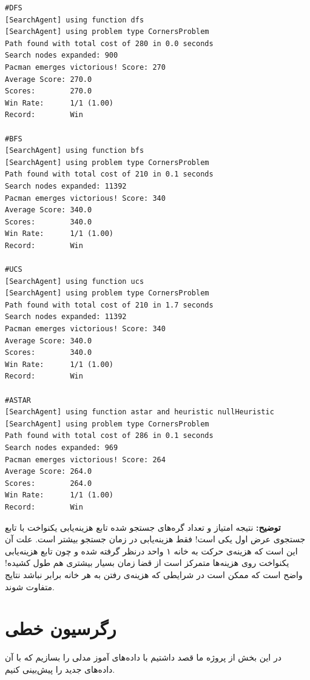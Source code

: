 \documentclass[11pt, a4paper, oneside]{book}
\begin{document}
\begin{LTR}
	\begin{verbatim}
#DFS
[SearchAgent] using function dfs
[SearchAgent] using problem type CornersProblem
Path found with total cost of 280 in 0.0 seconds
Search nodes expanded: 900
Pacman emerges victorious! Score: 270
Average Score: 270.0
Scores:        270.0
Win Rate:      1/1 (1.00)
Record:        Win

#BFS
[SearchAgent] using function bfs
[SearchAgent] using problem type CornersProblem
Path found with total cost of 210 in 0.1 seconds
Search nodes expanded: 11392
Pacman emerges victorious! Score: 340
Average Score: 340.0
Scores:        340.0
Win Rate:      1/1 (1.00)
Record:        Win

#UCS
[SearchAgent] using function ucs
[SearchAgent] using problem type CornersProblem
Path found with total cost of 210 in 1.7 seconds
Search nodes expanded: 11392
Pacman emerges victorious! Score: 340
Average Score: 340.0
Scores:        340.0
Win Rate:      1/1 (1.00)
Record:        Win

#ASTAR
[SearchAgent] using function astar and heuristic nullHeuristic
[SearchAgent] using problem type CornersProblem
Path found with total cost of 286 in 0.1 seconds
Search nodes expanded: 969
Pacman emerges victorious! Score: 264
Average Score: 264.0
Scores:        264.0
Win Rate:      1/1 (1.00)
Record:        Win
	\end{verbatim}
\end{LTR}

\textbf{توضیح:}
 نتیجه امتیاز و تعداد گره‌های جستجو شده  تابع هزینه‌یابی یکنواخت با تابع جستجوی عرض اول یکی است! فقط هزینه‌یابی در زمان جستجو بیشتر است. علت آن این است که هزینه‌ی حرکت به خانه ۱ واحد درنظر گرفته شده و چون تابع هزینه‌یابی یکنواخت روی هزینه‌ها متمرکز است از قضا زمان بسیار بیشتری هم طول کشیده! واضح است که ممکن است در شرایطی که هزینه‌ی رفتن به هر خانه برابر نباشد نتایج متفاوت شوند.

	
	
	
	
	
	
	
	
	
	
	
	\chapter{رگرسیون خطی}
	در این بخش از پروژه ما قصد داشتیم با داده‌های آموز مدلی را بسازیم که با آن داده‌های جدید را پیش‌بینی کنیم. 
\end{document}
